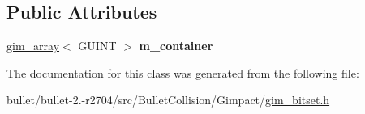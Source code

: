 \subsection*{Public Attributes}
\begin{DoxyCompactItemize}
\item 
\hypertarget{classgim__bitset_ac9f586b13505560e9e32bc140da5bbff}{\hyperlink{classgim__array}{gim\+\_\+array}$<$ G\+U\+I\+N\+T $>$ {\bfseries m\+\_\+container}}\label{classgim__bitset_ac9f586b13505560e9e32bc140da5bbff}

\end{DoxyCompactItemize}


The documentation for this class was generated from the following file\+:\begin{DoxyCompactItemize}
\item 
bullet/bullet-\/2.-\/r2704/src/\+Bullet\+Collision/\+Gimpact/\hyperlink{gim__bitset_8h}{gim\+\_\+bitset.\+h}\end{DoxyCompactItemize}
